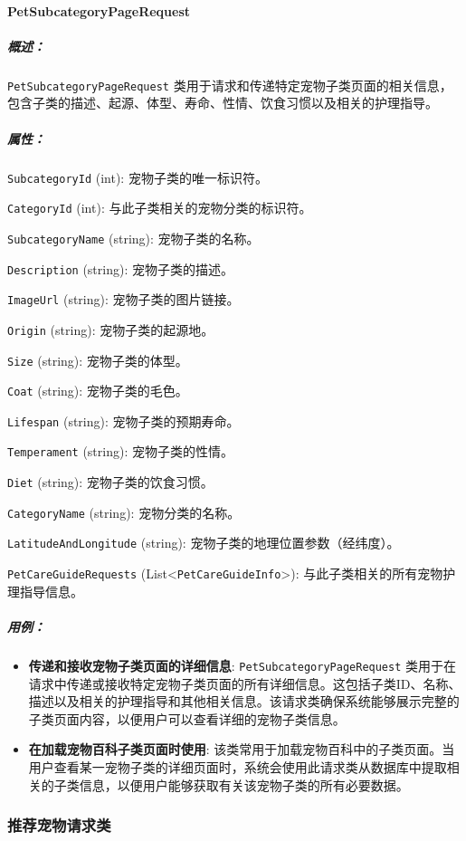 \paragraph{PetSubcategoryPageRequest}
\subparagraph{概述：} \texttt{PetSubcategoryPageRequest} 类用于请求和传递特定宠物子类页面的相关信息，包含子类的描述、起源、体型、寿命、性情、饮食习惯以及相关的护理指导。

\subparagraph{属性：}

\texttt{SubcategoryId} (int): 宠物子类的唯一标识符。

\texttt{CategoryId} (int): 与此子类相关的宠物分类的标识符。

\texttt{SubcategoryName} (string): 宠物子类的名称。

\texttt{Description} (string): 宠物子类的描述。

\texttt{ImageUrl} (string): 宠物子类的图片链接。

\texttt{Origin} (string): 宠物子类的起源地。

\texttt{Size} (string): 宠物子类的体型。

\texttt{Coat} (string): 宠物子类的毛色。

\texttt{Lifespan} (string): 宠物子类的预期寿命。

\texttt{Temperament} (string): 宠物子类的性情。

\texttt{Diet} (string): 宠物子类的饮食习惯。

\texttt{CategoryName} (string): 宠物分类的名称。

\texttt{LatitudeAndLongitude} (string): 宠物子类的地理位置参数（经纬度）。

\texttt{PetCareGuideRequests} (List<\texttt{PetCareGuideInfo}>): 与此子类相关的所有宠物护理指导信息。


\subparagraph{用例：}
\begin{itemize}
	\item \textbf{传递和接收宠物子类页面的详细信息}: \texttt{PetSubcategoryPageRequest} 类用于在请求中传递或接收特定宠物子类页面的所有详细信息。这包括子类ID、名称、描述以及相关的护理指导和其他相关信息。该请求类确保系统能够展示完整的子类页面内容，以便用户可以查看详细的宠物子类信息。
	\item \textbf{在加载宠物百科子类页面时使用}: 该类常用于加载宠物百科中的子类页面。当用户查看某一宠物子类的详细页面时，系统会使用此请求类从数据库中提取相关的子类信息，以便用户能够获取有关该宠物子类的所有必要数据。
\end{itemize}


\subsubsection{推荐宠物请求类}

